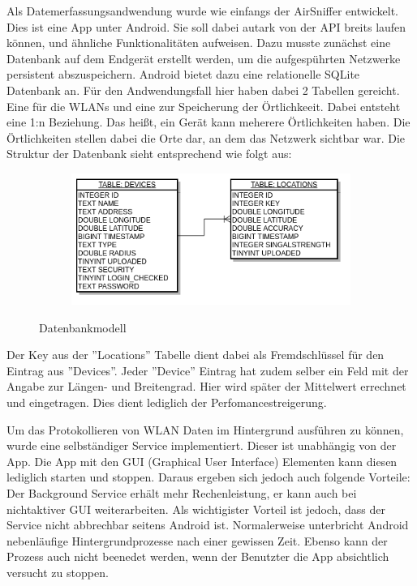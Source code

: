 \documentclass[11pt,a4paper]{article}
\begin{document}
Als Datemerfassungsandwendung wurde wie einfangs der AirSniffer entwickelt. Dies ist eine App unter Android. Sie soll dabei autark von der API breits laufen können, und ähnliche Funktionalitäten aufweisen. Dazu musste zunächst eine Datenbank auf dem Endgerät erstellt werden, um die aufgespührten Netzwerke persistent abszuspeichern. Android bietet dazu eine relationelle SQLite~\cite{sqlite} Datenbank an. Für den Andwendungsfall hier haben dabei 2 Tabellen gereicht. Eine für die WLANs und eine zur Speicherung der Örtlichkeeit. Dabei entsteht eine 1:n Beziehung. Das heißt, ein Gerät kann meherere Örtlichkeiten haben. Die Örtlichkeiten stellen dabei die Orte dar, an dem das Netzwerk sichtbar war. Die  Struktur der Datenbank sieht entsprechend wie folgt aus:

\begin{figure}[htbp]
    \centering
    \begin{subfigure}[b]{1\textwidth}
        \includegraphics[width=\textwidth]{pics/dbView.png}
    \end{subfigure}
    \caption{Datenbankmodell}\label{fig:DB_VIEW}
\end{figure}

Der Key aus der ''Locations'' Tabelle dient dabei als Fremdschlüssel für den Eintrag aus ''Devices''. Jeder ''Device'' Eintrag hat zudem selber ein Feld mit der Angabe zur Längen- und Breitengrad. Hier wird später der Mittelwert errechnet und eingetragen. Dies dient lediglich der Perfomancestreigerung. 

Um das Protokollieren von WLAN Daten im Hintergrund ausführen zu können, wurde eine selbständiger Service implementiert. Dieser ist unabhängig von der App. Die App mit den GUI (Graphical User Interface) Elementen kann diesen lediglich starten und stoppen. Daraus ergeben sich jedoch auch folgende Vorteile: Der Background Service erhält mehr Rechenleistung, er kann auch bei nichtaktiver GUI weiterarbeiten. Als wichtigister Vorteil ist jedoch, dass der Service nicht abbrechbar seitens Android ist. Normalerweise unterbricht Android nebenläufige Hintergrundprozesse nach einer gewissen Zeit. Ebenso kann der Prozess auch nicht beenedet werden, wenn der Benutzter die App absichtlich versucht zu stoppen. 
\end{document}
